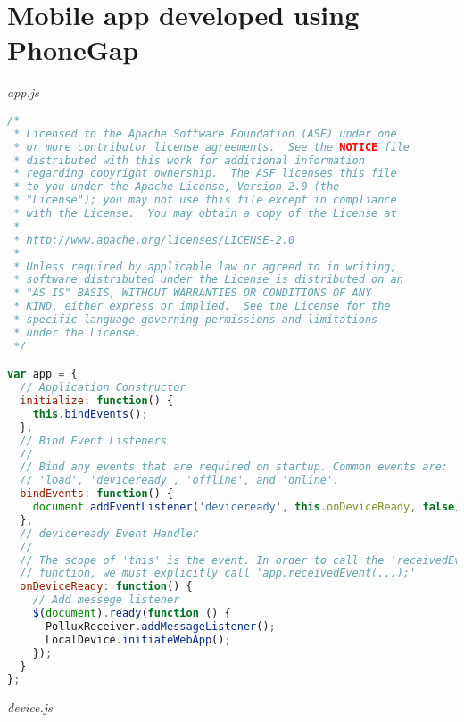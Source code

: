 \section{Mobile app developed using PhoneGap} \label{App:AppendixB}
\emph{app.js}
\begin{lstlisting}[language=JavaScript]
/*
 * Licensed to the Apache Software Foundation (ASF) under one
 * or more contributor license agreements.  See the NOTICE file
 * distributed with this work for additional information
 * regarding copyright ownership.  The ASF licenses this file
 * to you under the Apache License, Version 2.0 (the
 * "License"); you may not use this file except in compliance
 * with the License.  You may obtain a copy of the License at
 *
 * http://www.apache.org/licenses/LICENSE-2.0
 *
 * Unless required by applicable law or agreed to in writing,
 * software distributed under the License is distributed on an
 * "AS IS" BASIS, WITHOUT WARRANTIES OR CONDITIONS OF ANY
 * KIND, either express or implied.  See the License for the
 * specific language governing permissions and limitations
 * under the License.
 */

var app = {
  // Application Constructor
  initialize: function() {
    this.bindEvents();  
  },
  // Bind Event Listeners
  //
  // Bind any events that are required on startup. Common events are:
  // 'load', 'deviceready', 'offline', and 'online'.
  bindEvents: function() {
    document.addEventListener('deviceready', this.onDeviceReady, false);
  },
  // deviceready Event Handler
  //
  // The scope of 'this' is the event. In order to call the 'receivedEvent'
  // function, we must explicitly call 'app.receivedEvent(...);'
  onDeviceReady: function() {
    // Add messege listener
    $(document).ready(function () {
      PolluxReceiver.addMessageListener();
      LocalDevice.initiateWebApp();
    });
  }
};
\end{lstlisting}
\emph{device.js}
